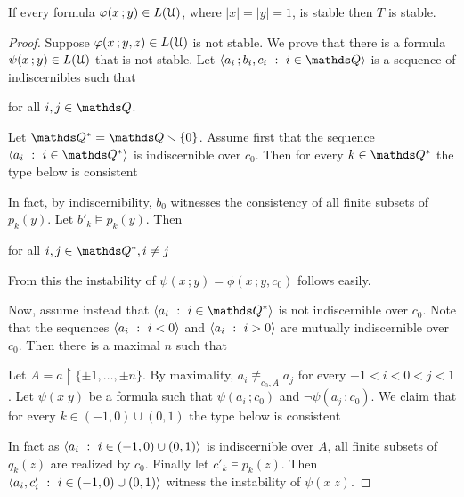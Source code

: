 \begin{theorem}
  If every formula $\varphi(x\,;y)\in L(\EuScript U)$, where $|x|=|y|=1$, is stable then $T$ is stable.
\end{theorem} 

\begin{proof}
  Suppose $\varphi(x\,;y,z)\in L(\EuScript U)$ is not stable.
  We prove that there is a formula $\psi(x\,;y)\in L(\EuScript U)$ that is not stable.
  Let $\<a_i\,;b_i,c_i\ :\ i\in\QQ\>$ is a sequence of indiscernibles such that 

  \hfill for all $i,j\in\QQ$.

  Let $\QQ^*=\QQ\sm\{0\}$.
  Assume first that the sequence $\<a_i\ :\ i\in\QQ^*\>$ is indiscernible over $c_0$.
  Then for every $k\in\QQ^*$ the type below is consistent


  In fact, by indiscernibility, $b_0$ witnesses the consistency of all finite subsets of $p_k(y)$.
  Let $b'_k\models p_k(y)$.
  Then

  \hfill for all $i,j\in\QQ^*, i\neq j$

  From this the instability of $\psi(x\,;y)=\phi(x\,;y,c_0)$ follows easily.

  Now, assume instead that $\<a_i\ :\ i\in\QQ^*\>$ is not indiscernible over $c_0$.
  Note that the sequences $\<a_i\ :\ i<0\>$ and $\<a_i\ :\ i>0\>$ are mutually indiscernible over $c_0$.
  Then there is a maximal $n$ such that


  Let $A=a\restriction\{\pm1,\dots,\pm n\}$.
  By maximality, $a_i\nequiv_{c_0,A}a_j$ for every $-1<i<0<j<1$.
  Let $\psi(x\;y)$ be a formula such that $\psi(a_i\,;c_0)$ and $\neg\psi(a_j\,;c_0)$.
  We claim that for every $k\in(-1,0)\cup(0,1)$ the type below is consistent


  In fact as $\<a_i\ :\ i\in(-1,0)\cup(0,1)\>$ is indiscernible over $A$, all finite subsets of $q_k(z)$ are realized by $c_0$.
  Finally let $c'_k\models p_k(z)$.
  Then $\<a_i,c'_i\ :\ i\in(-1,0)\cup(0,1)\>$ witness the instability of $\psi(x\;z)$.
\end{proof}

